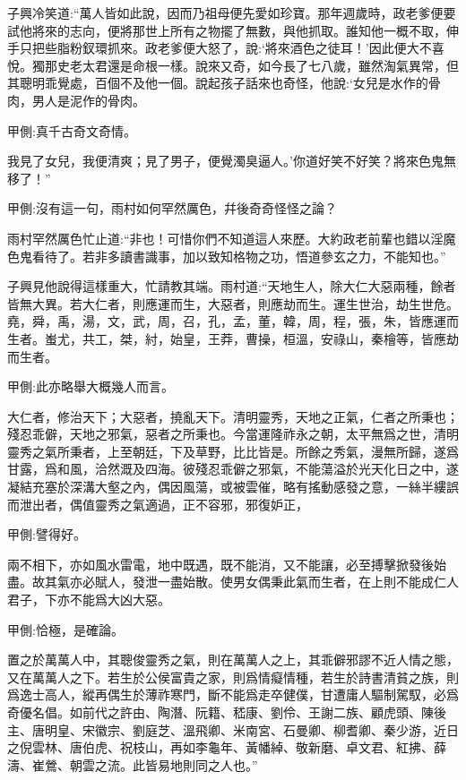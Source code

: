 \begin{parag}
    子興冷笑道:“萬人皆如此說，因而乃祖母便先愛如珍寶。那年週歲時，政老爹便要試他將來的志向，便將那世上所有之物擺了無數，與他抓取。誰知他一概不取，伸手只把些脂粉釵環抓來。政老爹便大怒了，說:‘將來酒色之徒耳！’因此便大不喜悅。獨那史老太君還是命根一樣。說來又奇，如今長了七八歲，雖然淘氣異常，但其聰明乖覺處，百個不及他一個。說起孩子話來也奇怪，他說:‘女兒是水作的骨肉，男人是泥作的骨肉。\begin{note}甲側:真千古奇文奇情。\end{note}我見了女兒，我便清爽；見了男子，便覺濁臭逼人。’你道好笑不好笑？將來色鬼無移了！”\begin{note}甲側:沒有這一句，雨村如何罕然厲色，幷後奇奇怪怪之論？\end{note}雨村罕然厲色忙止道:“非也！可惜你們不知道這人來歷。大約政老前輩也錯以淫魔色鬼看待了。若非多讀書識事，加以致知格物之功，悟道參玄之力，不能知也。”
\end{parag}


\begin{parag}
    子興見他說得這樣重大，忙請教其端。雨村道:“天地生人，除大仁大惡兩種，餘者皆無大異。若大仁者，則應運而生，大惡者，則應劫而生。運生世治，劫生世危。堯，舜，禹，湯，文，武，周，召，孔，孟，董，韓，周，程，張，朱，皆應運而生者。蚩尤，共工，桀，紂，始皇，王莽，曹操，桓溫，安祿山，秦檜等，皆應劫而生者。\begin{note}甲側:此亦略舉大概幾人而言。\end{note}大仁者，修治天下；大惡者，撓亂天下。清明靈秀，天地之正氣，仁者之所秉也；殘忍乖僻，天地之邪氣，惡者之所秉也。今當運隆祚永之朝，太平無爲之世，清明靈秀之氣所秉者，上至朝廷，下及草野，比比皆是。所餘之秀氣，漫無所歸，遂爲甘露，爲和風，洽然溉及四海。彼殘忍乖僻之邪氣，不能蕩溢於光天化日之中，遂凝結充塞於深溝大壑之內，偶因風蕩，或被雲催，略有搖動感發之意，一絲半縷誤而泄出者，偶值靈秀之氣適過，正不容邪，邪復妒正，\begin{note}甲側:譬得好。\end{note}兩不相下，亦如風水雷電，地中既遇，既不能消，又不能讓，必至搏擊掀發後始盡。故其氣亦必賦人，發泄一盡始散。使男女偶秉此氣而生者，在上則不能成仁人君子，下亦不能爲大凶大惡。\begin{note}甲側:恰極，是確論。\end{note}置之於萬萬人中，其聰俊靈秀之氣，則在萬萬人之上，其乖僻邪謬不近人情之態，又在萬萬人之下。若生於公侯富貴之家，則爲情癡情種，若生於詩書清貧之族，則爲逸士高人，縱再偶生於薄祚寒門，斷不能爲走卒健僕，甘遭庸人驅制駕馭，必爲奇優名倡。如前代之許由、陶潛、阮籍、嵇康、劉伶、王謝二族、顧虎頭、陳後主、唐明皇、宋徽宗、劉庭芝、溫飛卿、米南宮、石曼卿、柳耆卿、秦少游，近日之倪雲林、唐伯虎、祝枝山，再如李龜年、黃幡綽、敬新磨、卓文君、紅拂、薛濤、崔鶯、朝雲之流。此皆易地則同之人也。”
\end{parag}


